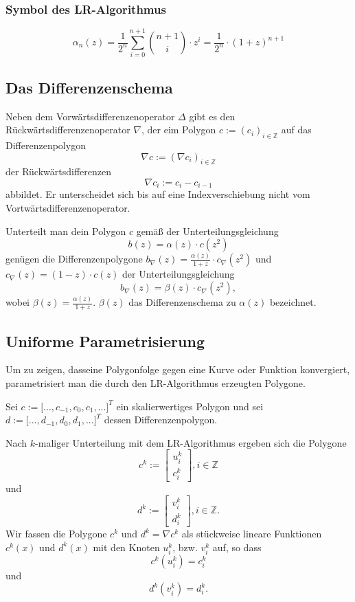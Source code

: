 \subsubsection{Symbol des LR-Algorithmus}
\[\alpha_n(z) = \frac{1}{2^n} \sum_{i=0}^{n+1} \binom{n+1}{i} \cdot z^i = \frac{1}{2^n}\cdot (1+z)^{n+1}\]


\subsection{Das Differenzenschema}
Neben dem Vorwärtsdifferenzenoperator \(\Delta\) gibt es den Rückwärtsdifferenzenoperator \(\nabla\), der eim Polygon \(c:=(c_i)_{i \in \mathbb{Z}}\) auf das Differenzenpolygon
\[\nabla c := (\nabla c_i)_{i \in \mathbb{Z}}\]
der Rückwärtsdifferenzen
\[\nabla c_i := c_i - c_{i-1}\]
abbildet. Er unterscheidet sich bis auf eine Indexverschiebung nicht vom Vortwärtsdifferenzenoperator.

Unterteilt man dein Polygon \(c\) gemäß der Unterteilungsgleichung
\[b(z) = \alpha(z) \cdot c(z^2)\]
genügen die Differenzenpolygone \(b_{\nabla}(z) = \frac{\alpha(z)}{1+z} \cdot c_{\nabla}(z^2)\) und \(c_{\nabla}(z) = (1-z)\cdot c(z)\) der Unterteilungsgleichung
\[b_{\nabla}(z) = \beta(z) \cdot c_{\nabla}(z^2),\]
wobei \(\beta(z) = \frac{\alpha(z)}{1+z}\). \(\beta(z)\) das Differenzenschema zu \(\alpha(z)\) bezeichnet.


\subsection{Uniforme Parametrisierung}
Um zu zeigen, dasseine Polygonfolge gegen eine Kurve oder Funktion konvergiert, parametrisiert man die durch den LR-Algorithmus erzeugten Polygone.

Sei \(c := \lbrack ...,c_{-1},c_0,c_1,...\rbrack^T\) ein skalierwertiges Polygon und sei \(d := \lbrack ...,d_{-1},d_0,d_1,...\rbrack^T\) dessen Differenzenpolygon.

Nach \(k\)-maliger Unterteilung mit dem LR-Algorithmus ergeben sich die Polygone
\[c^k := \begin{bmatrix} u_i^k \\ c_i^k \end{bmatrix}, i \in \mathbb{Z}\]
und
\[d^k := \begin{bmatrix} v_i^k \\ d_i^k \end{bmatrix}, i \in \mathbb{Z}.\]
Wir fassen die Polygone \(c^k\) und \(d^k = \nabla c^k\) als stückweise lineare Funktionen \(c^k(x)\) und \(d^k(x)\) mit den Knoten \(u_i^k\), bzw. \(v_i^k\) auf, so dass
\[c^k(u_i^k) = c_i^k\]
und
\[d^k(v_i^k) = d_i^k.\]

